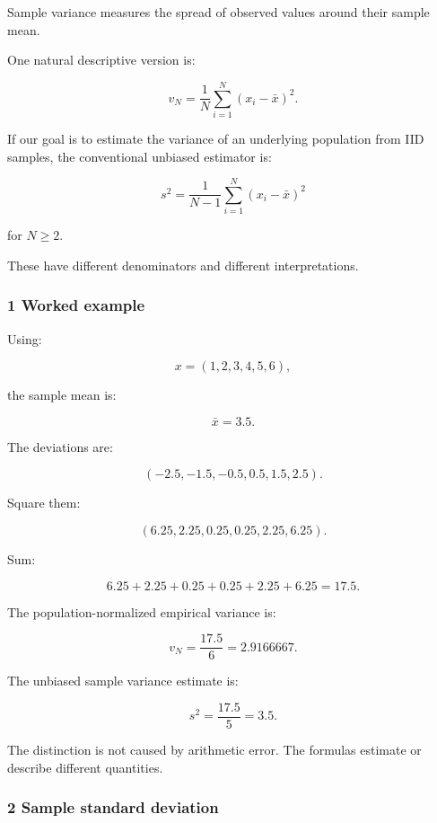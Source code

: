 Sample variance measures the spread of observed values around their sample mean.

One natural descriptive version is:

\[
 \boxed{ v_N= \frac1N \sum_{i=1}^{N}(x_i-\bar x)^2 }.
\]

If our goal is to estimate the variance of an underlying population from IID samples, the conventional unbiased estimator is:

\[
 \boxed{ s^2= \frac1{N-1} \sum_{i=1}^{N}(x_i-\bar x)^2 }
\]

for \(N\ge2\).

These have different denominators and different interpretations.

\begin{allmightroleexample}

\subsubsection{1 Worked example}\label{02-foundations-ii-ch030-worked-example}

\hypertarget{02-foundations-ii-ch030-worked-example}{}

Using:

\end{allmightroleexample}

\[
 x=(1,2,3,4,5,6),
\]

the sample mean is:

\[
 \bar x=3.5.
\]

The deviations are:

\[
 (-2.5,-1.5,-0.5,0.5,1.5,2.5).
\]

Square them:

\[
 (6.25,2.25,0.25,0.25,2.25,6.25).
\]

Sum:

\[
 6.25+2.25+0.25+0.25+2.25+6.25 =\boxed{17.5}.
\]

The population-normalized empirical variance is:

\[
 v_N=\frac{17.5}{6} =\boxed{2.9166667}.
\]

The unbiased sample variance estimate is:

\[
 s^2=\frac{17.5}{5} =\boxed{3.5}.
\]

The distinction is not caused by arithmetic error. The formulas estimate or describe different quantities.

\subsubsection{2 Sample standard deviation}\label{02-foundations-ii-ch030-sample-standard-deviation}

